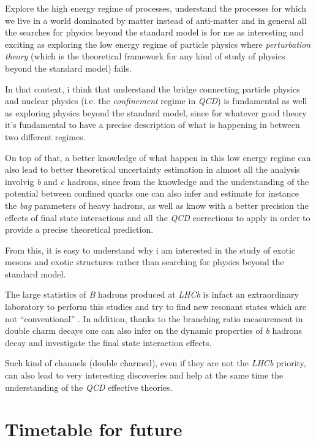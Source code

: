 \documentclass[paper=a4, fontsize=10pt]{scrartcl}
\numberwithin{equation}{section}		%
\numberwithin{figure}{section}			%
\numberwithin{table}{section}				%
\begin{document}
Explore the high energy regime of processes, understand the processes for which we live in a world dominated by matter instead of anti-matter and in general all the searches for physics beyond the standard model is for me as interesting and exciting as exploring the low energy regime of particle physics where \textit{perturbation theory} (which is the theoretical framework for any kind of study of physics beyond the standard model) fails.

In that context, i think that understand the bridge connecting particle physics and nuclear physics (i.e. the \textit{confinement} regime in \textit{QCD}) is fundamental as well as exploring physics beyond the standard model, since for whatever good theory it's fundamental to have a precise description of what is happening in between two different regimes.

On top of that, a better knowledge of what happen in this low energy regime can also lead to better theoretical uncertainty estimation in almost all the analysis involvig \textit{b} and \textit{c} hadrons, since from the knowledge and the understanding of the potential between confined quarks one can also infer and estimate for instance the \textit{bag} parameters of heavy hadrons, as well as know with a better precision the effects of final state interactions and all the \textit{QCD} corrections to apply in order to provide a precise theoretical prediction. 

From this, it is easy to understand why i am interested in the study of exotic mesons and exotic structures rather than searching for physics beyond the standard model. 

The large statistics of \textit{B} hadrons produced at \textit{LHCb} is infact an extraordinary laboratory to perform this studies and try to find new resonant states which are not ``conventional'' . In addition, thanks to the branching ratio measurement in double charm decays one can also infer on the dynamic properties of \textit{b} hadrons decay and investigate the final state interaction effects.

Such kind of channels (double charmed), even if they are not the \textit{LHCb} priority, can also lead to very interesting discoveries and help at the same time the understanding of the \textit{QCD} effective theories.

\section{Timetable for future}
\end{document}
